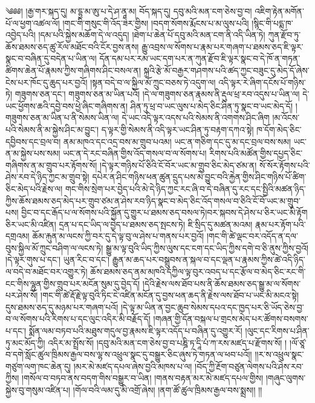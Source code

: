 \setcounter{footnote}{0} 
༄༅༅། །རྒྱ་གར་སྐད་དུ། མ་དྷྱ་མ་ཨུ་པ་དེ་ཤ་ནཱ་མ། བོད་སྐད་དུ། དབུ་མའི་མན་ངག་ཅེས་བྱ་བ། འཇིག་རྟེན་མགོན་པོ་ལ་ཕྱག་འཚལ་ལོ། །གང་གི་གསུང་གི་འོད་ཟེར་གྱིས། །བདག་སོགས་རྨོངས་པ་མ་ལུས་པའི། །སྙིང་གི་པདྨ་ཁ་འབྱེད་པའི། །དམ་པའི་སྐྱེས་མཆོག་དེ་ལ་འདུད། །ཐེག་པ་ཆེན་པོ་དབུ་མའི་མན་ངག་ནི་འདི་ཡིན་ཏེ། ཀུན་རྫོབ་ཏུ་ཆོས་ཐམས་ཅད་ཚུ་རོལ་མཐོང་བའི་ངོར་བྱས་ནས། རྒྱུ་འབྲས་ལ་སོགས་པ་རྣམ་པར་གཞག་པ་ཐམས་ཅད་ཇི་ལྟར་སྣང་བ་བཞིན་དུ་བདེན་པ་ཡིན་ལ། དོན་དམ་པར་རམ་ཡང་དག་པར་ན་ཀུན་རྫོབ་ཇི་ལྟར་སྣང་བ་དེ་ཁོ་ན་གཏན་ཚིགས་ཆེན་པོ་རྣམས་ཀྱིས་གཞིགས་ཤིང་བསལ་ན། སྐྲའི་རྩེ་མོ་བརྒྱར་གཤགས་པའི་ཚད་ཀྱང་བཟུང་དུ་མེད་དོ་ཞེས་ངེས་པར་ཁོང་དུ་ཆུད་པར་བྱའོ། །སྟན་བདེ་བ་ལ་སྐྱིལ་མོ་ཀྲུང་བཅས་ཏེ་འདུག་ལ། འདི་ལྟར་རེ་ཞིག་དངོས་པོ་གཉིས་ཏེ། གཟུགས་ཅན་དང་། གཟུགས་ཅན་མ་ཡིན་པའོ། །དེ་ལ་གཟུགས་ཅན་རྣམས་ནི་རྡུལ་ཕྲ་རབ་འདུས་པ་ཡིན་ལ། དེ་ཡང་ཕྱོགས་ཆའི་དབྱེ་བས་ཕྱེ་ཞིང་གཞིགས་ན། ཤིན་ཏུ་ཕྲ་བ་ཡང་ལུས་པ་མེད་ཅིང་ཤིན་ཏུ་སྣང་བ་ཡང་མེད་དོ། །གཟུགས་ཅན་མ་ཡིན་པ་ནི་སེམས་ཡིན་ལ། དེ་ཡང་འདི་ལྟར་འདས་པའི་སེམས་ནི་འགགས་ཤིང་ཞིག །མ་འོངས་པའི་སེམས་ནི་མ་སྐྱེས་ཤིང་མ་བྱུང་། ད་ལྟར་གྱི་སེམས་ནི་འདི་ལྟར་ཡང་ཤིན་ཏུ་བརྟག་དཀའ་སྟེ། ཁ་དོག་མེད་ཅིང་དབྱིབས་དང་བྲལ་བ། ནམ་མཁའ་དང་འདྲ་བས་མ་གྲུབ་པའམ། ཡང་ན་གཅིག་དང་དུ་མ་དང་བྲལ་བས་སམ། ཡང་ན་མ་སྐྱེས་པས་སམ། ཡང་ན་དེ་རང་བཞིན་གྱིས་འོད་གསལ་བ་ལ་སོགས་པ། རིགས་པའི་མཚོན་གྱིས་དཔྱད་ཅིང་གཞིགས་ན་མ་གྲུབ་པར་རྟོགས་སོ། །དེ་ལྟར་གཉིས་པོ་ཅིའི་ངོ་བོར་ཡང་མ་གྲུབ་ཅིང་མེད་ཙམ་ན། སོ་སོར་རྟོགས་པའི་ཤེས་རབ་དེ་ཉིད་ཀྱང་མ་གྲུབ་སྟེ། དཔེར་ན་ཤིང་གཉིས་ཕན་ཚུན་དྲུད་པས་མེ་བྱུང་བའི་རྐྱེན་གྱིས་ཤིང་གཉིས་པོ་ཚིག་ཅིང་མེད་པའི་རྗེས་ལ། གང་གིས་སྲེག་པར་བྱེད་པའི་མེ་དེ་ཉིད་ཀྱང་རང་ཞི་བ་དེ་བཞིན་དུ་རང་དང་སྤྱིའི་མཚན་ཉིད་ཀྱིས་ཆོས་ཐམས་ཅད་མེད་པར་གྲུབ་ཙམ་ན་ཤེས་རབ་ཉིད་སྣང་བ་མེད་ཅིང་འོད་གསལ་བ་ཅིའི་ངོ་བོ་ཡང་མ་གྲུབ་པས། བྱིང་བ་དང་རྒོད་པ་ལ་སོགས་པའི་སྐྱོན་དུ་གྱུར་པ་ཐམས་ཅད་བསལ་ཏེ།བར་སྐབས་དེ་ཤེས་པ་ཅིར་ཡང་མི་རྟོག ཅིར་ཡང་མི་འཛིན། དྲན་པ་དང་ཡིད་ལ་བྱེད་པ་ཐམས་ཅད་སྤངས་ཏེ། ཇི་སྲིད་དུ་མཚན་མའམ། རྣམ་པར་རྟོག་པའི་དགྲའམ། ཆོམ་རྐུན་མ་ལངས་ཀྱི་བར་དུ་དེ་ལྟ་བུ་ལ་ཤེས་པ་གནས་པར་བྱའོ། །གང་གི་ཚེ་ལྡང་བར་འདོད་ན་དལ་བུས་སྐྱིལ་མོ་ཀྲུང་བཤིག་ལ་ལངས་ཏེ། སྒྱུ་མ་ལྟ་བུའི་ཡིད་ཀྱིས་ལུས་དང་ངག་དང་ཡིད་ཀྱིས་དགེ་བ་ཅི་ནུས་ཀྱིས་བྱའོ། །དེ་ལྟར་གུས་པ་དང་། ཡུན་རིང་བ་དང་། རྒྱུན་མ་ཆད་པར་བསྒྲུབས་ན་སྐལ་བ་དང་ལྡན་པ་རྣམས་ཀྱིས་ཚེ་འདི་ཉིད་ལ་བདེ་བ་མཐོང་བར་འགྱུར་ཏེ། ཆོས་ཐམས་ཅད་ནམ་མཁའི་དཀྱིལ་ལྟ་བུར་འབད་པ་དང་རྩོལ་བ་མེད་ཅིང་རང་གི་ངང་གིས་ལྷུན་གྱིས་གྲུབ་པར་མངོན་སུམ་དུ་བྱེད་དོ། །དེའི་རྗེས་ལས་ཐོབ་པས་ནི་ཆོས་ཐམས་ཅད་སྒྱུ་མ་ལ་སོགས་པར་ཤེས་སོ། །གང་གི་ཚེ་རྡོ་རྗེ་ལྟ་བུའི་ཏིང་ངེ་འཛིན་མངོན་དུ་བྱས་ཕན་ཆད་ནི་རྗེས་ལས་ཐོབ་པ་ཡང་མི་མངའ་སྟེ། དུས་ཐམས་ཅད་དུ་མཉམ་པར་གཞག་པའོ། །དེ་ལྟ་མ་ཡིན་ན་བྱང་ཆུབ་སེམས་དཔའ་དང་ཁྱད་པར་ཅི་ཡོད་ཅེས་བྱ་བ་ལ་སོགས་པའི་རིགས་པ་དང་ལུང་འདིར་མི་བརྗོད་དོ། །གཞན་གྱི་དོན་བསྐལ་པ་གྲངས་མེད་པར་ཚོགས་བསགས་པ་དང་། སྨོན་ལམ་བཏབ་པའི་མཐུས་གདུལ་བྱ་རྣམས་ཇི་ལྟར་འདོད་པ་བཞིན་དུ་འགྱུར་རོ། །ལུང་དང་རིགས་པ་ཤིན་ཏུ་མང་མོད་ཀྱི། འདིར་མ་སྤྲོས་སོ། །དབུ་མའི་མན་ངག་ཅེས་བྱ་བ་པཎྜི་ཏ་དཱི་པཾ་ཀ་རས་མཛད་པ་རྫོགས་སོ། ། །ལོ་ཙཱ་བ་དགེ་སློང་ཚུལ་ཁྲིམས་རྒྱལ་བས་ལྷ་ས་འཕྲུལ་སྣང་དུ་བསྒྱུར་ཅིང་ཞུས་ཏེ་གཏན་ལ་ཕབ་པའོ།། །།ར་ས་འཕྲུལ་སྣང་གཙུག་ལག་ཁང་ཆེན་དུ། །མར་མེ་མཛད་དཔལ་ཞེས་བྱའི་མཁས་པ་ལ། །བོད་ཀྱི་རྔོག་བཙུན་ལེགས་པའི་ཤེས་རབ་ཀྱིས། །གསོལ་བ་བཏབ་ནས་བདག་གིས་བསྒྱུར་བ་ཡིན། །གནས་བརྟན་མར་མེ་མཛད་དཔལ་གྱིས། །གཞུང་ལུགས་སྐྱེས་བུ་གསུམ་འཛིན་པ། །གོལ་བའི་ལམ་དུ་མི་འགྲོ་ཞེས། །ནག་ཚོ་ཚུལ་ཁྲིམས་རྒྱལ་བས་སྨྲས།། །།